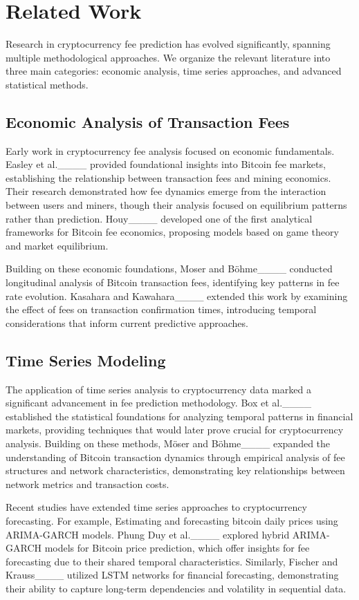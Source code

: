 \section{Related Work}
Research in cryptocurrency fee prediction has evolved significantly, spanning multiple methodological approaches. We organize the relevant literature into three main categories: economic analysis, time series approaches, and advanced statistical methods.

\subsection{Economic Analysis of Transaction Fees}
Early work in cryptocurrency fee analysis focused on economic fundamentals. Easley et al.____ provided foundational insights into Bitcoin fee markets, establishing the relationship between transaction fees and mining economics. Their research demonstrated how fee dynamics emerge from the interaction between users and miners, though their analysis focused on equilibrium patterns rather than prediction. Houy____ developed one of the first analytical frameworks for Bitcoin fee economics, proposing models based on game theory and market equilibrium.

Building on these economic foundations, Moser and Böhme____ conducted longitudinal analysis of Bitcoin transaction fees, identifying key patterns in fee rate evolution. Kasahara and Kawahara____ extended this work by examining the effect of fees on transaction confirmation times, introducing temporal considerations that inform current predictive approaches.

\subsection{Time Series Modeling}
The application of time series analysis to cryptocurrency data marked a significant advancement in fee prediction methodology. Box et al.____ established the statistical foundations for analyzing temporal patterns in financial markets, providing techniques that would later prove crucial for cryptocurrency analysis. Building on these methods, Möser and Böhme____ expanded the understanding of Bitcoin transaction dynamics through empirical analysis of fee structures and network characteristics, demonstrating key relationships between network metrics and transaction costs.

Recent studies have extended time series approaches to cryptocurrency forecasting. For example, 
Estimating and forecasting bitcoin daily prices using ARIMA-GARCH models.
Phung Duy et al.____ explored hybrid ARIMA-GARCH models for Bitcoin price prediction, which offer insights for fee forecasting due to their shared temporal characteristics. Similarly, Fischer and Krauss____ utilized LSTM networks for financial forecasting, demonstrating their ability to capture long-term dependencies and volatility in sequential data.

